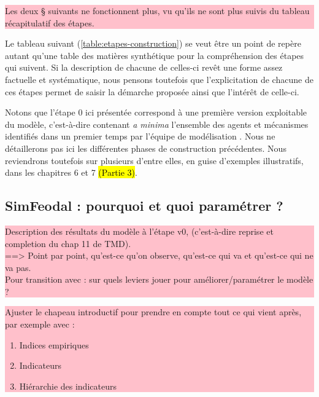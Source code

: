 \documentclass[12pt, a4paper, oneside]{book}
\begin{document}
	\colorbox{pink}{\parbox{0.9\textwidth}{%
			\vskip5pt
			Les deux § suivants ne fonctionnent plus, vu qu'ils ne sont plus suivis du tableau récapitulatif des étapes.
			\vskip5pt
		}
	}
	
	Le tableau suivant (\cref{table:etapes-construction}) se veut être un point de repère autant qu'une table des matières synthétique pour la compréhension des étapes qui suivent. Si la description de chacune de celles-ci revêt une forme assez factuelle et systématique, nous pensons toutefois que l'explicitation de chacune de ces étapes permet de saisir la démarche proposée ainsi que l'intérêt de celle-ci.
	
	Notons que l'étape 0 ici présentée correspond à une première version \og exploitable\fg{} du modèle, c'est-à-dire contenant \textit{a minima} l'ensemble des agents et mécanismes identifiés dans un premier temps par l'équipe de modélisation \autocite{tannier_ontologie_2014-2}. Nous ne détaillerons pas ici les différentes phases de construction précédentes. Nous reviendrons toutefois sur plusieurs d'entre elles, en guise d'exemples illustratifs, dans les chapitres 6 et 7 \hl{(Partie 3)}.
	
	\pagebreak
	\subsection{SimFeodal : pourquoi et quoi paramétrer ?}
	
			\colorbox{pink}{\parbox{0.9\textwidth}{%
			\vskip5pt
			Description des \og résultats\fg{} du modèle à l'étape v0, (c'est-à-dire reprise et completion du chap 11 de TMD).\\
			==> Point par point, qu'est-ce qu'on observe, qu'est-ce qui va et qu'est-ce qui ne va pas.\\
			Pour transition avec : sur quels leviers jouer pour améliorer/paramétrer le modèle ?
			
			\vskip5pt
		}
	}

\bigskip

			\colorbox{pink}{\parbox{0.9\textwidth}{%
		\vskip5pt
		Ajuster le chapeau introductif pour prendre en compte tout ce qui vient après, par exemple avec :
		\begin{enumerate}
			\item Indices empiriques
			\item Indicateurs
			\item Hiérarchie des indicateurs
		\end{enumerate}
		
		\vskip5pt
	}
}
\end{document}
